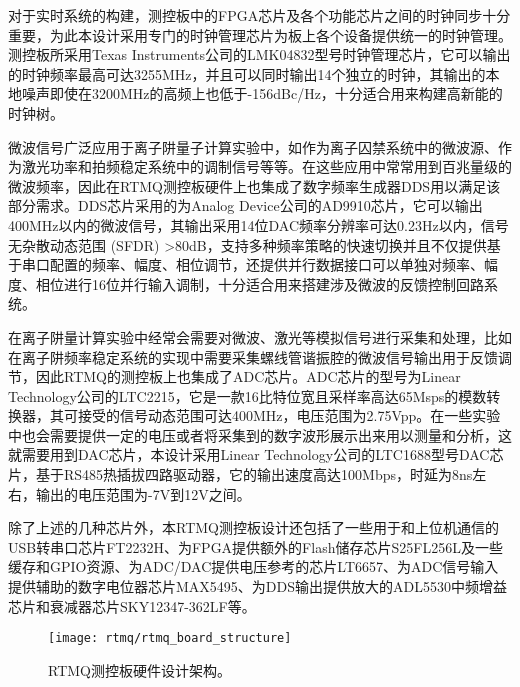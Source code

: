 对于实时系统的构建，测控板中的FPGA芯片及各个功能芯片之间的时钟同步十分重要，为此本设计采用专门的时钟管理芯片为板上各个设备提供统一的时钟管理。测控板所采用Texas Instruments公司的LMK04832\cite[]{lmk04832_2018}型号时钟管理芯片，它可以输出的时钟频率最高可达3255MHz，并且可以同时输出14个独立的时钟，其输出的本地噪声即使在3200MHz的高频上也低于-156dBc/Hz，十分适合用来构建高新能的时钟树。


微波信号广泛应用于离子阱量子计算实验中，如作为离子囚禁系统中的微波源、作为激光功率和拍频稳定系统中的调制信号等等。在这些应用中常常用到百兆量级的微波频率，因此在RTMQ测控板硬件上也集成了数字频率生成器DDS用以满足该部分需求。DDS芯片采用的为Analog Device公司的AD9910\cite[]{AD9910_2020}芯片，它可以输出400MHz以内的微波信号，其输出采用14位DAC频率分辨率可达0.23Hz以内，信号无杂散动态范围 (SFDR) >80dB，支持多种频率策略的快速切换并且不仅提供基于串口配置的频率、幅度、相位调节，还提供并行数据接口可以单独对频率、幅度、相位进行16位并行输入调制，十分适合用来搭建涉及微波的反馈控制回路系统。


在离子阱量计算实验中经常会需要对微波、激光等模拟信号进行采集和处理，比如在离子阱频率稳定系统的实现中需要采集螺线管谐振腔的微波信号输出用于反馈调节，因此RTMQ的测控板上也集成了ADC芯片。ADC芯片的型号为Linear Technology公司的LTC2215\cite[]{ADC_2020}，它是一款16比特位宽且采样率高达65Msps的模数转换器，其可接受的信号动态范围可达400MHz，电压范围为2.75Vpp。在一些实验中也会需要提供一定的电压或者将采集到的数字波形展示出来用以测量和分析，这就需要用到DAC芯片，本设计采用Linear Technology公司的LTC1688型号DAC芯片，基于RS485热插拔四路驱动器，它的输出速度高达100Mbps，时延为8ns左右，输出的电压范围为-7V到12V之间。

除了上述的几种芯片外，本RTMQ测控板设计还包括了一些用于和上位机通信的USB转串口芯片FT2232H\cite[]{FT2232H_2020}、为FPGA提供额外的Flash储存芯片S25FL256L\cite[]{S25FL256L_2017}及一些缓存和GPIO资源、为ADC/DAC提供电压参考的芯片LT6657\cite[]{LY6657_2020}、为ADC信号输入提供辅助的数字电位器芯片MAX5495\cite[]{MAX5495_2020}、为DDS输出提供放大的ADL5530\cite[]{ADL5530_2020}中频增益芯片和衰减器芯片SKY12347-362LF\cite[]{SKY12347_2011}等。

\begin{figure}
    \centering
    \caption[RTMQ测控板硬件设计架构]{RTMQ测控板硬件设计架构。\label{fig:rtmq_board_structure}}
    \texttt{[image: rtmq/rtmq\_board\_structure]}
\end{figure}



